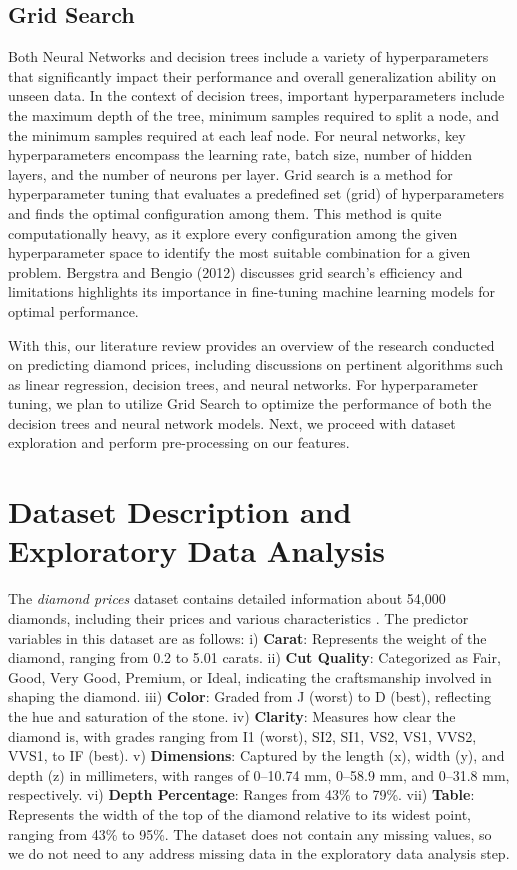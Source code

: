 \documentclass[conference]{IEEEtran}
\begin{document}
\subsection{Grid Search}

Both Neural Networks and decision trees include a variety of hyperparameters that significantly impact their performance and overall generalization ability on unseen data. In the context of decision trees, important hyperparameters include the maximum depth of the tree, minimum samples required to split a node, and the minimum samples required at each leaf node. For neural networks, key hyperparameters encompass the learning rate, batch size, number of hidden layers, and the number of neurons per layer. Grid search is a method for hyperparameter tuning that evaluates a predefined set (grid) of hyperparameters and finds the optimal configuration among them. This method is quite computationally heavy, as it explore every configuration among the given hyperparameter space to identify the most suitable combination for a given problem. Bergstra and Bengio (2012) \cite{Bergstra} discusses grid search's efficiency and limitations highlights its importance in fine-tuning machine learning models for optimal performance.

With this, our literature review provides an overview of the research conducted on predicting diamond prices, including discussions on pertinent algorithms such as linear regression, decision trees, and neural networks. For hyperparameter tuning, we plan to utilize Grid Search to optimize the performance of both the decision trees and neural network models. Next, we proceed with dataset exploration and perform pre-processing on our features.

\section{Dataset Description and Exploratory Data Analysis}

The \emph{diamond prices} dataset contains detailed information about 54,000 diamonds, including their prices and various characteristics \cite{kaggle}. The predictor variables in this dataset are as follows: i) \textbf{Carat}: Represents the weight of the diamond, ranging from 0.2 to 5.01 carats. ii) \textbf{Cut Quality}: Categorized as Fair, Good, Very Good, Premium, or Ideal, indicating the craftsmanship involved in shaping the diamond. iii) \textbf{Color}: Graded from J (worst) to D (best), reflecting the hue and saturation of the stone. iv) \textbf{Clarity}: Measures how clear the diamond is, with grades ranging from I1 (worst), SI2, SI1, VS2, VS1, VVS2, VVS1, to IF (best). v) \textbf{Dimensions}: Captured by the length (x), width (y), and depth (z) in millimeters, with ranges of 0–10.74 mm, 0–58.9 mm, and 0–31.8 mm, respectively. vi) \textbf{Depth Percentage}: Ranges from 43\% to 79\%. vii) \textbf{Table}: Represents the width of the top of the diamond relative to its widest point, ranging from 43\% to 95\%. The dataset does not contain any missing values, so we do not need to any address missing data in the exploratory data analysis step.
\end{document}
